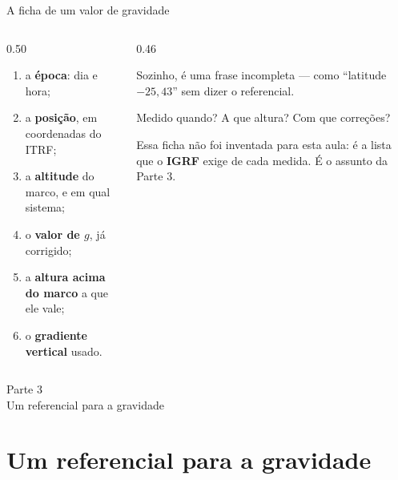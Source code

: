 \documentclass[aspectratio=169,11pt]{beamer}
\newcommand{\bnum}[1]{\textbf{\textcolor{mTeal}{#1}}}
\newcommand{\fram}[1]{\textcolor{corMedido}{\textbf{#1}}}
\begin{document}
\begin{frame}{A ficha de um valor de gravidade}
  \begin{columns}[T]
    \begin{column}{0.50\textwidth}
      \begin{ideia}[title={Uma medida absoluta completa diz}]
        \begin{enumerate}
          \item a \bnum{época}: dia e hora;
          \item a \bnum{posição}, em coordenadas do ITRF;
          \item a \bnum{altitude} do marco, e em qual sistema;
          \item o \bnum{valor de $g$}, já corrigido;
          \item a \bnum{altura acima do marco} a que ele vale;
          \item o \bnum{gradiente vertical} usado.
        \end{enumerate}
      \end{ideia}
    \end{column}
    \begin{column}{0.46\textwidth}
      \begin{armadilha}[title={``$g = 978\,760{,}387$ mGal''}]
        Sozinho, é uma frase incompleta --- como ``latitude $-25{,}43$'' sem dizer o
        referencial.
        \medskip

        Medido quando? A que altura? Com que correções?
      \end{armadilha}
      \medskip
      {\small Essa ficha não foi inventada para esta aula: é a lista que o \fram{IGRF}
      exige de cada medida. É o assunto da Parte 3.}
    \end{column}
  \end{columns}
\end{frame}

\begin{frame}[standout]
  Parte 3\\[6pt]
  {\normalsize Um referencial para a gravidade}
\end{frame}

\section{Um referencial para a gravidade}
\end{document}
